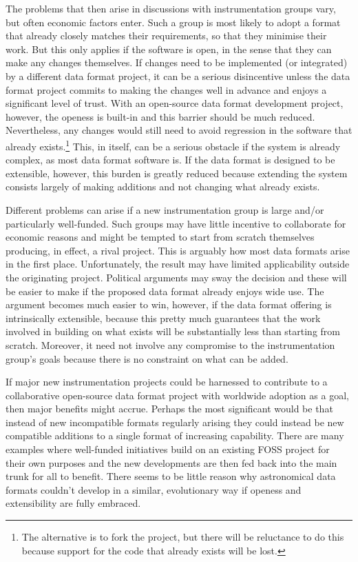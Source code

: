 \documentclass[final,authoryear,5p,times,twocolumn]{elsarticle}
\begin{document}
The problems that then arise in discussions with instrumentation
groups vary, but often economic factors enter. Such a group is most
likely to adopt a format that already closely matches their
requirements, so that they minimise their work. But this only applies
if the software is open, in the sense that they can make any changes
themselves. If changes need to be implemented (or integrated) by a
different data format project, it can be a serious disincentive unless
the data format project commits to making the changes well in advance
and enjoys a significant level of trust. With an open-source data
format development project, however, the openess is built-in and this
barrier should be much reduced. Nevertheless, any changes would still
need to avoid regression in the software that already
exists.\footnote{The alternative is to fork the project, but there
  will be reluctance to do this because support for the code that
  already exists will be lost.}  This, in itself, can be a serious
obstacle if the system is already complex, as most data format
software is. If the data format is designed to be extensible, however,
this burden is greatly reduced because extending the system consists
largely of making additions and not changing what already exists.

Different problems can arise if a new instrumentation group is large
and/or particularly well-funded. Such groups may have little incentive
to collaborate for economic reasons and might be tempted to start from
scratch themselves producing, in effect, a rival project. This is
arguably how most data formats arise in the first
place. Unfortunately, the result may have limited applicability
outside the originating project. Political arguments may sway the
decision and these will be easier to make if the proposed data format
already enjoys wide use. The argument becomes much easier to win,
however, if the data format offering is intrinsically extensible,
because this pretty much guarantees that the work involved in building
on what exists will be substantially less than starting from
scratch. Moreover, it need not involve any compromise to the
instrumentation group's goals because there is no constraint on what
can be added.

If major new instrumentation projects could be harnessed to contribute
to a collaborative open-source data format project with worldwide
adoption as a goal, then major benefits might accrue. Perhaps the most
significant would be that instead of new incompatible formats
regularly arising they could instead be new compatible additions to a
single format of increasing capability. There are many examples where
well-funded initiatives build on an existing FOSS project for their
own purposes and the new developments are then fed back into the main
trunk for all to benefit. There seems to be little reason why
astronomical data formats couldn't develop in a similar, evolutionary
way if openess and extensibility are fully embraced.
\end{document}
